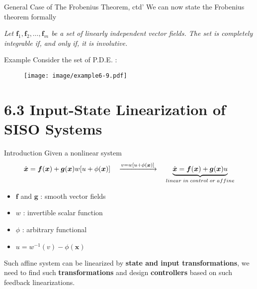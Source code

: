 \documentclass{beamer}
\renewcommand{\vec}[1]{\ensuremath{\boldsymbol{#1}}} %
\begin{document}
\begin{frame}{General Case of The Frobenius Theorem, ctd'}
    We can now state the Frobenius theorem formally
    \vspace{+20pt}
    \begin{theorem}[6.1 Frobenius]
    \textit{
      Let $\vec{f}_{1}, \vec{f}_{2}, \dots, \vec{f}_{m}$ be a set of linearly independent vector fields. The set is {\color{red}completely integrable} if, and only if, it is {\color{red}involutive}.
    }
\end{theorem}
\end{frame}


\begin{frame}{Example}
Consider the set of P.D.E. :
\vspace{-20pt}
    \begin{figure}
      \centering
      \texttt{[image: image/example6-9.pdf]}
    \end{figure}
\end{frame}


\section{6.3  Input-State Linearization of SISO Systems}

\begin{frame}{Introduction}
Given a nonlinear system
$$
\dot{\vec{x}}=\vec{f}(\vec{x})+\vec{g}(\vec{x})w[u+\phi(\vec{x})] \quad \xrightarrow{v=w[u+\phi(\vec{x})]} \quad \underbrace{\dot{\vec{x}}=\vec{f}(\vec{x})+\vec{g}(\vec{x})u}_{\tiny linear~in~control~or ~affine}
$$
\vspace{-20pt}
\begin{itemize}
  \item \vec{f} and \vec{g} : smooth vector fields
  \item $w$ : invertible scalar function
  \item $\phi$ : arbitrary functional
  \item $u = w^{-1}(v)-\phi(\vec{x})$
\end{itemize}
Such affine system can be linearized by \textbf{state and input transformations}, we need to find such \textbf{transformations} and design \textbf{controllers} based on such feedback linearizations.
\end{frame}
\end{document}
